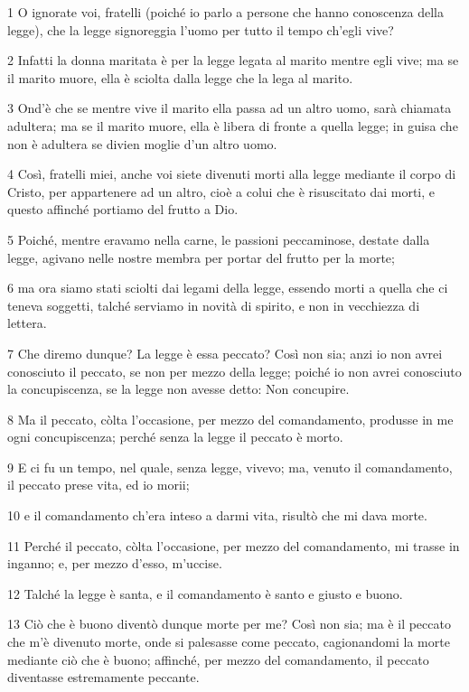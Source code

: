 \par 1 O ignorate voi, fratelli (poiché io parlo a persone che hanno conoscenza della legge), che la legge signoreggia l'uomo per tutto il tempo ch'egli vive?
\par 2 Infatti la donna maritata è per la legge legata al marito mentre egli vive; ma se il marito muore, ella è sciolta dalla legge che la lega al marito.
\par 3 Ond'è che se mentre vive il marito ella passa ad un altro uomo, sarà chiamata adultera; ma se il marito muore, ella è libera di fronte a quella legge; in guisa che non è adultera se divien moglie d'un altro uomo.
\par 4 Così, fratelli miei, anche voi siete divenuti morti alla legge mediante il corpo di Cristo, per appartenere ad un altro, cioè a colui che è risuscitato dai morti, e questo affinché portiamo del frutto a Dio.
\par 5 Poiché, mentre eravamo nella carne, le passioni peccaminose, destate dalla legge, agivano nelle nostre membra per portar del frutto per la morte;
\par 6 ma ora siamo stati sciolti dai legami della legge, essendo morti a quella che ci teneva soggetti, talché serviamo in novità di spirito, e non in vecchiezza di lettera.
\par 7 Che diremo dunque? La legge è essa peccato? Così non sia; anzi io non avrei conosciuto il peccato, se non per mezzo della legge; poiché io non avrei conosciuto la concupiscenza, se la legge non avesse detto: Non concupire.
\par 8 Ma il peccato, còlta l'occasione, per mezzo del comandamento, produsse in me ogni concupiscenza; perché senza la legge il peccato è morto.
\par 9 E ci fu un tempo, nel quale, senza legge, vivevo; ma, venuto il comandamento, il peccato prese vita, ed io morii;
\par 10 e il comandamento ch'era inteso a darmi vita, risultò che mi dava morte.
\par 11 Perché il peccato, còlta l'occasione, per mezzo del comandamento, mi trasse in inganno; e, per mezzo d'esso, m'uccise.
\par 12 Talché la legge è santa, e il comandamento è santo e giusto e buono.
\par 13 Ciò che è buono diventò dunque morte per me? Così non sia; ma è il peccato che m'è divenuto morte, onde si palesasse come peccato, cagionandomi la morte mediante ciò che è buono; affinché, per mezzo del comandamento, il peccato diventasse estremamente peccante.
